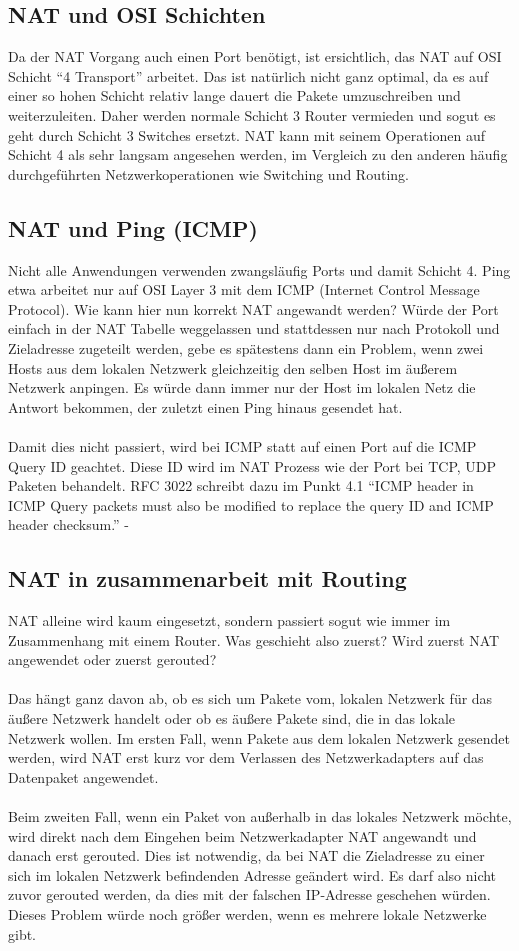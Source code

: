 \subsection{NAT und OSI Schichten}
Da der NAT Vorgang auch einen Port benötigt, ist ersichtlich, das NAT auf OSI Schicht “4 Transport” arbeitet. Das ist natürlich nicht ganz optimal, da es auf einer so hohen Schicht relativ lange dauert die Pakete umzuschreiben und weiterzuleiten. Daher werden normale Schicht 3 Router vermieden und sogut es geht durch Schicht 3 Switches ersetzt. NAT kann mit seinem Operationen auf Schicht 4 als sehr langsam angesehen werden, im Vergleich zu den anderen häufig durchgeführten Netzwerkoperationen wie Switching und Routing.

\subsection{NAT und Ping (ICMP)}
Nicht alle Anwendungen verwenden zwangsläufig Ports und damit Schicht 4. Ping etwa arbeitet nur auf OSI Layer 3 mit dem ICMP (Internet Control Message Protocol). Wie kann hier nun korrekt NAT angewandt werden? Würde der Port einfach in der NAT Tabelle weggelassen und stattdessen nur nach Protokoll und Zieladresse zugeteilt werden, gebe es spätestens dann ein Problem, wenn zwei Hosts aus dem lokalen Netzwerk gleichzeitig den selben Host im äußerem Netzwerk anpingen. Es würde dann immer nur der Host im lokalen Netz die Antwort bekommen, der zuletzt einen Ping hinaus gesendet hat. 
\\\\
Damit dies nicht passiert, wird bei ICMP statt auf einen Port auf die ICMP Query ID geachtet. Diese ID wird im NAT Prozess wie der Port bei TCP, UDP Paketen behandelt. RFC 3022 schreibt dazu im Punkt 4.1 “ICMP header in ICMP Query packets must also be modified to replace the query ID and ICMP header checksum.” - %

\subsection{NAT in zusammenarbeit mit Routing}
NAT alleine wird kaum eingesetzt, sondern passiert sogut wie immer im Zusammenhang mit einem Router. Was geschieht also zuerst? Wird zuerst NAT angewendet oder zuerst gerouted?
\\\\
Das hängt ganz davon ab, ob es sich um Pakete vom, lokalen Netzwerk für das äußere Netzwerk handelt oder ob es äußere Pakete sind, die in das lokale Netzwerk wollen.
Im ersten Fall, wenn Pakete aus dem lokalen Netzwerk gesendet werden, wird NAT erst kurz vor dem Verlassen des Netzwerkadapters auf das Datenpaket angewendet. 
\\\\
Beim zweiten Fall, wenn ein Paket von außerhalb in das lokales Netzwerk möchte, wird direkt nach dem Eingehen beim Netzwerkadapter NAT angewandt und danach erst gerouted. Dies ist notwendig, da bei NAT die Zieladresse zu einer sich im lokalen Netzwerk befindenden Adresse geändert wird. Es darf also nicht zuvor gerouted werden, da dies mit der falschen IP-Adresse geschehen würden. Dieses Problem würde noch größer werden, wenn es mehrere lokale Netzwerke gibt.

